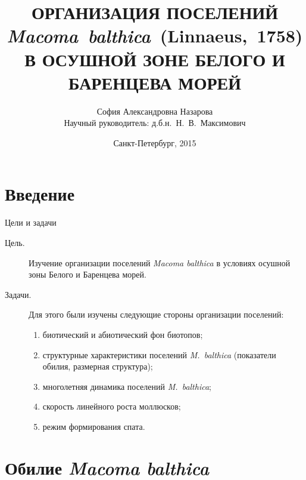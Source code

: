 \documentclass{beamer}
\begin{document}
\title[]{ОРГАНИЗАЦИЯ ПОСЕЛЕНИЙ\\ {\it Macoma~balthica}~(Linnaeus,~1758)\\ В ОСУШНОЙ ЗОНЕ БЕЛОГО И БАРЕНЦЕВА МОРЕЙ}
\author[]{София Александровна Назарова \\ \medskip
	\footnotesize{Научный руководитель: д.б.н.~Н.~В.~Максимович}}
\date{Санкт-Петербург, 2015} 

\frame{\titlepage} 





		\section{Введение}
\begin{frame}{Цели и задачи}
\begin{description}
	\item[Цель.] Изучение организации поселений {\it Macoma balthica} в условиях осушной зоны Белого и Баренцева морей.

	\item[Задачи.]
Для этого были изучены следующие стороны организации поселений:
  \begin{enumerate}
    \item биотический и абиотический фон биотопов;
    \item структурные характеристики поселений \textit{M.~balthica} (показатели обилия, размерная структура);
    \item многолетняя динамика поселений \textit{M.~balthica};
    \item скорость линейного роста моллюсков;
    \item режим формирования спата.
  \end{enumerate}
\end{description}
\end{frame}

		\section[Обилие]{Обилие {\it Macoma balthica}}
\end{document}
